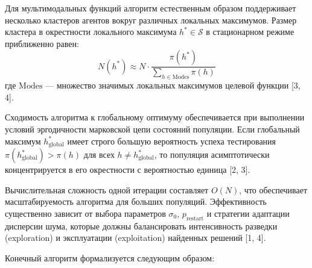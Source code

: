 \documentclass{article}
\newcommand{\1}{\mathds{1}}
\begin{document}
Для мультимодальных функций алгоритм естественным образом поддерживает несколько кластеров агентов вокруг различных локальных максимумов. Размер кластера в окрестности локального максимума $h^* \in \mathcal{S}$ в стационарном режиме приближенно равен:
\begin{equation}
    N(h^*) \approx N \cdot \frac{\pi(h^*)}{\sum_{h \in \text{Modes}} \pi(h)}
\end{equation}
где $\text{Modes}$ — множество значимых локальных максимумов целевой функции [3, 4].

Сходимость алгоритма к глобальному оптимуму обеспечивается при выполнении условий эргодичности марковской цепи состояний популяции. Если глобальный максимум $h^*_{\text{global}}$ имеет строго большую вероятность успеха тестирования $\pi(h^*_{\text{global}}) > \pi(h)$ для всех $h \neq h^*_{\text{global}}$, то популяция асимптотически концентрируется в его окрестности с вероятностью единица [2, 3].

Вычислительная сложность одной итерации составляет $O(N)$, что обеспечивает масштабируемость алгоритма для больших популяций. Эффективность существенно зависит от выбора параметров $\sigma_0$, $p_{\text{restart}}$ и стратегии адаптации дисперсии шума, которые должны балансировать интенсивность разведки (exploration) и эксплуатации (exploitation) найденных решений [1, 4].

Конечный алгоритм формализуется следующим образом:
\end{document}
